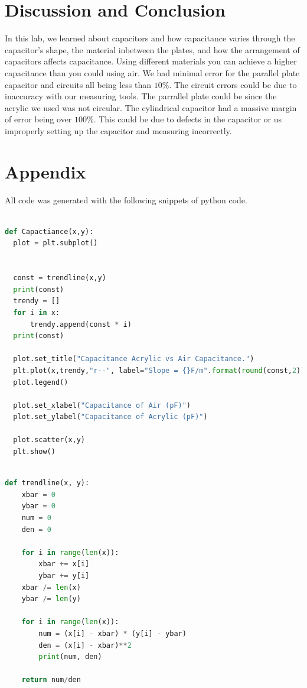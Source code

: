 \documentclass[10pt]{article}
\begin{document}
\section{Discussion and Conclusion}
In this lab, we learned about capacitors and how capacitance varies through the capacitor's shape,
the material inbetween the plates, and how the arrangement of capacitors affects capacitance. Using 
different materials you can achieve a higher capacitance than you could using air. We had minimal error 
for the parallel plate capacitor and circuits all being less than $10\%$. The circuit errors could be 
due to inaccuracy with our measuring tools. The parrallel plate could be since the acrylic we used 
was not circular. The cylindrical capacitor had a massive margin of error being over $100\%$. This 
could be due to defects in the capacitor or us improperly setting up the capacitor and measuring 
incorrectly.\\
\section*{Appendix}

All code was generated with the following snippets of python code.

\begin{lstlisting}[language=Python, caption={Python code for generating Capacitance of air vs Acrylic}]

def Capactiance(x,y):
  plot = plt.subplot()


  const = trendline(x,y)
  print(const)
  trendy = []
  for i in x:
      trendy.append(const * i)
  print(const)

  plot.set_title("Capacitance Acrylic vs Air Capacitance.")
  plt.plot(x,trendy,"r--", label="Slope = {}F/m".format(round(const,2)))
  plot.legend()

  plot.set_xlabel("Capacitance of Air (pF)")
  plot.set_ylabel("Capacitance of Acrylic (pF)")

  plot.scatter(x,y)
  plt.show()  

  \end{lstlisting}

\begin{lstlisting}[language=Python, caption={Python code for generating the slope of the trend line}]

def trendline(x, y):
    xbar = 0
    ybar = 0
    num = 0
    den = 0

    for i in range(len(x)):
        xbar += x[i]
        ybar += y[i]
    xbar /= len(x)
    ybar /= len(y)

    for i in range(len(x)):
        num = (x[i] - xbar) * (y[i] - ybar)
        den = (x[i] - xbar)**2
        print(num, den)

    return num/den

  \end{lstlisting}



\end{document}
